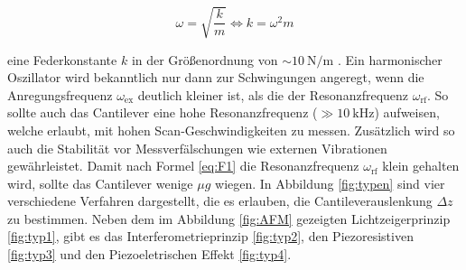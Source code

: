 \begin{equation}
  \omega = \sqrt{\frac{k}{m}}
  \iff
  k = \omega^2 m
  \label{eq:F1}
\end{equation}

\noindent
eine Federkonstante $k$ in der Größenordnung von $\sim\SI{10}{\newton\per\meter}$ \cite[157]{AFM}.
Ein harmonischer Oszillator wird bekanntlich nur dann zur Schwingungen angeregt,
wenn die Anregungs{\-}fre{\-}quenz $\omega_{\text{ex}}$ deutlich kleiner ist, als die
der Resonanzfrequenz $\omega_{\text{rf}}$. So sollte auch das Cantilever eine
hohe Resonanzfrequenz ($\gg \SI{10}{\kilo\hertz}$) aufweisen, welche erlaubt,
mit hohen Scan-Geschwindigkeiten zu messen. Zusätzlich wird so auch die Stabilität
vor Messverfälschungen wie externen Vibrationen gewährleistet. Damit nach Formel \ref{eq:F1}
die Resonanzfrequenz $\omega_{\text{rf}}$ klein gehalten wird, sollte das
Cantilever wenige $\mu g$ wiegen. In Abbildung \ref{fig:typen} sind vier verschiedene
Verfahren dargestellt, die es erlauben, die Cantilever{\-}aus{\-}lenkung $\Delta z$ zu bestimmen.
Neben dem im Abbildung \ref{fig:AFM} gezeigten Lichtzeigerprinzip \ref{fig:typ1},
gibt es das Interferometrieprinzip \ref{fig:typ2}, den Piezoresistiven
\ref{fig:typ3} und den Piezoeletrischen Effekt \ref{fig:typ4}.


